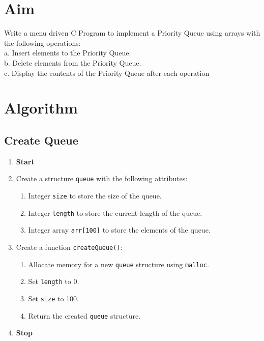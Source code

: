 
\section{Aim}
Write a menu driven C Program to implement a Priority Queue using arrays with the
following operations:
\\a. Insert elements to the Priority Queue.
\\b. Delete elements from the Priority Queue.
\\c. Display the contents of the Priority Queue after each operation

\section{Algorithm}
 {\selectfont

  \subsection{Create Queue}
  \begin{enumerate}[label=\arabic*:,left=0pt]
    \item \textbf{Start}
    \item Create a structure \texttt{queue} with the following attributes:
          \begin{enumerate}[label=2.\arabic*:,left=0pt]
            \item Integer \texttt{size} to store the size of the queue.
            \item Integer \texttt{length} to store the current length of the queue.
            \item Integer array \texttt{arr[100]} to store the elements of the queue.
          \end{enumerate}
    \item Create a function \texttt{createQueue()}:
          \begin{enumerate}[label=3.\arabic*:,left=0pt]
            \item Allocate memory for a new \texttt{queue} structure using \texttt{malloc}.
            \item Set \texttt{length} to 0.
            \item Set \texttt{size} to 100.
            \item Return the created \texttt{queue} structure.
          \end{enumerate}
    \item \textbf{Stop}
  \end{enumerate}

}
